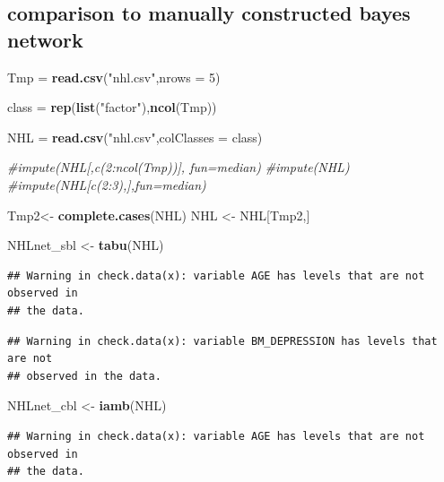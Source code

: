 \documentclass[]{article}
\newenvironment{Shaded}{\begin{snugshade}}{\end{snugshade}}
\newcommand{\KeywordTok}[1]{\textcolor[rgb]{0.13,0.29,0.53}{\textbf{{#1}}}}
\newcommand{\DataTypeTok}[1]{\textcolor[rgb]{0.13,0.29,0.53}{{#1}}}
\newcommand{\DecValTok}[1]{\textcolor[rgb]{0.00,0.00,0.81}{{#1}}}
\newcommand{\StringTok}[1]{\textcolor[rgb]{0.31,0.60,0.02}{{#1}}}
\newcommand{\CommentTok}[1]{\textcolor[rgb]{0.56,0.35,0.01}{\textit{{#1}}}}
\newcommand{\NormalTok}[1]{{#1}}
\begin{document}
\clearpage

\subsection{comparison to manually constructed bayes
network}\label{comparison-to-manually-constructed-bayes-network}

\begin{Shaded}
\begin{Highlighting}[]
\NormalTok{Tmp =}\StringTok{ }\KeywordTok{read.csv}\NormalTok{(}\StringTok{"nhl.csv"}\NormalTok{,}\DataTypeTok{nrows =} \DecValTok{5}\NormalTok{)}


\NormalTok{class =}\StringTok{ }\KeywordTok{rep}\NormalTok{(}\KeywordTok{list}\NormalTok{(}\StringTok{"factor"}\NormalTok{),}\KeywordTok{ncol}\NormalTok{(Tmp))}


\NormalTok{NHL =}\StringTok{ }\KeywordTok{read.csv}\NormalTok{(}\StringTok{"nhl.csv"}\NormalTok{,}\DataTypeTok{colClasses =} \NormalTok{class)}


\CommentTok{#impute(NHL[,c(2:ncol(Tmp))], fun=median)}
\CommentTok{#impute(NHL)}
\CommentTok{#impute(NHL[c(2:3),],fun=median)}

\NormalTok{Tmp2<-}\StringTok{ }\KeywordTok{complete.cases}\NormalTok{(NHL)}
\NormalTok{NHL <-}\StringTok{ }\NormalTok{NHL[Tmp2,]}


\NormalTok{NHLnet_sbl <-}\StringTok{ }\KeywordTok{tabu}\NormalTok{(NHL)}
\end{Highlighting}
\end{Shaded}

\begin{verbatim}
## Warning in check.data(x): variable AGE has levels that are not observed in
## the data.
\end{verbatim}

\begin{verbatim}
## Warning in check.data(x): variable BM_DEPRESSION has levels that are not
## observed in the data.
\end{verbatim}

\begin{Shaded}
\begin{Highlighting}[]
\NormalTok{NHLnet_cbl <-}\StringTok{ }\KeywordTok{iamb}\NormalTok{(NHL)}
\end{Highlighting}
\end{Shaded}

\begin{verbatim}
## Warning in check.data(x): variable AGE has levels that are not observed in
## the data.
\end{verbatim}
\end{document}
